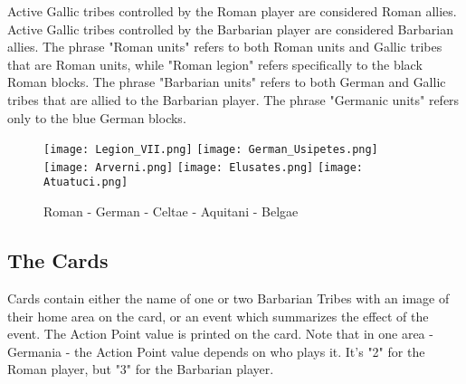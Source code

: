 Active Gallic tribes controlled by the Roman player are considered Roman allies. Active Gallic tribes controlled by the Barbarian player are considered Barbarian allies. The phrase "Roman units" refers to both Roman units and Gallic tribes that are Roman units, while "Roman legion" refers specifically to the black Roman blocks. The phrase "Barbarian units" refers to both German and Gallic tribes that are allied to the Barbarian player. The phrase "Germanic units" refers only to the blue German blocks.

\begin{figure}[h]
  \centering
  \texttt{[image: Legion\_VII.png]}
  \texttt{[image: German\_Usipetes.png]}
  \texttt{[image: Arverni.png]}
  \texttt{[image: Elusates.png]}
  \texttt{[image: Atuatuci.png]}
  \caption*{Roman - German - Celtae - Aquitani - Belgae}
\end{figure}

\par
\subsection{The Cards}
Cards contain either the name of one or two Barbarian Tribes with an image of their home area on the card, or an event which summarizes the effect of the event. The Action Point value is printed on the card. Note that in one area - Germania - the Action Point value depends on who plays it. It's "2" for the Roman player, but "3" for the Barbarian player.
